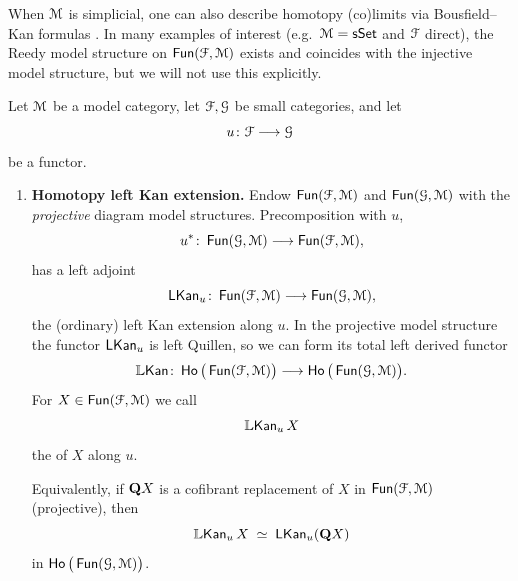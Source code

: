 When $\mathcal M$ is simplicial, one can also describe homotopy (co)limits via
Bousfield--Kan formulas \cite[Ch.~18]{Hir14}. In many examples of interest
(e.g.\ $\mathcal M=\operatorname{\sf sSet}$ and $\mathcal F$ direct), the Reedy model structure on $\operatorname{{\sf Fun}}(\mathcal F,\mathcal M)$ exists and coincides with the injective model structure,
but we will not use this explicitly.



\begin{definition}\label{ch2:: def: homotopy-kan}
  Let $\mathcal M$ be a model category, let $\mathcal F,\mathcal G$ be small categories, and let
  \[
    u \colon \mathcal F \longrightarrow \mathcal G
  \]
  be a functor.

  \begin{enumerate}
    \item \textbf{Homotopy left Kan extension.}
    Endow $\operatorname{{\sf Fun}}(\mathcal F,\mathcal M)$ and $\operatorname{{\sf Fun}}(\mathcal G,\mathcal M)$ with the \emph{projective}
    diagram model structures. Precomposition with $u$,
    \begin{equation}
      u^{\ast} \colon \operatorname{{\sf Fun}}(\mathcal G,\mathcal M) \longrightarrow \operatorname{{\sf Fun}}(\mathcal F,\mathcal M),
    \end{equation}
    has a left adjoint
    \begin{equation}
      \operatorname{{\sf LKan}}_u \colon \operatorname{{\sf Fun}}(\mathcal F,\mathcal M) \longrightarrow \operatorname{{\sf Fun}}(\mathcal G,\mathcal M),
    \end{equation}
    the (ordinary) left Kan extension along $u$.
    In the projective model structure the functor $\operatorname{{\sf LKan}}_u$ is left
    Quillen, so we can form its total left derived functor
    \begin{equation}
      \operatorname{\mathbb{L}\mathsf{Kan}} \colon
      \operatorname{\sf Ho}\big(\operatorname{{\sf Fun}}(\mathcal F,\mathcal M)\big) \longrightarrow \operatorname{\sf Ho}\big(\operatorname{{\sf Fun}}(\mathcal G,\mathcal M)\big).
    \end{equation}
    For $X\in \operatorname{{\sf Fun}}(\mathcal F,\mathcal M)$ we call
    \begin{equation}
      \operatorname{\mathbb{L}\mathsf{Kan}}_u X
    \end{equation}
    the  of $X$ along $u$.

    Equivalently, if $\mathbf Q X$ is a cofibrant replacement of $X$ in
    $\operatorname{{\sf Fun}}(\mathcal F,\mathcal M)$ (projective), then
    \begin{equation}
      \operatorname{\mathbb{L}\mathsf{Kan}}_u X \;\simeq\; \operatorname{{\sf LKan}}_u(\mathbf Q X)
    \end{equation}
    in $\operatorname{\sf Ho}\big(\operatorname{{\sf Fun}}(\mathcal G,\mathcal M)\big)$.


\end{enumerate}
\end{definition}

